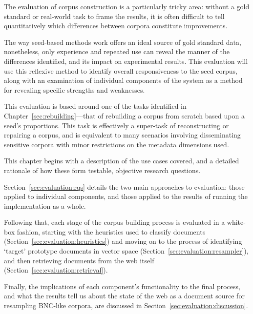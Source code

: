 
The evaluation of corpus construction is a particularly tricky area: without a gold standard or real-world task to frame the results, it is often difficult to tell quantitatively which differences between corpora constitute improvements.


The way seed-based methods work offers an ideal source of gold standard data, nonetheless, only experience and repeated use can reveal the manner of the differences identified, and its impact on experimental results.  This evaluation will use this reflexive method to identify overall responsiveness to the seed corpus, along with an examination of individual components of the system as a method for revealing specific strengths and weaknesses.

This evaluation is based around one of the tasks identified in Chapter~\ref{sec:rebuilding}---that of rebuilding a corpus from scratch based upon a seed's proportions.  This task is effectively a super-task of reconstructing or repairing a corpus, and is equivalent to many scenarios involving disseminating sensitive corpora with minor restrictions on the metadata dimensions used.



This chapter begins with a description of the use cases covered, and a detailed rationale of how these form testable, objective research questions.

Section~\ref{sec:evaluation:rqs} details the two main approaches to evaluation: those applied to individual components, and those applied to the results of running the implementation as a whole.

Following that, each stage of the corpus building process is evaluated in a white-box fashion, starting with the heuristics used to classify documents (Section~\ref{sec:evaluation:heuristics}) and moving on to the process of identifying `target' prototype documents in vector space (Section~\ref{sec:evaluation:resampler}), and then retrieving documents from the web itself (Section~\ref{sec:evaluation:retrieval}).

Finally, the implications of each component's functionality to the final process, and what the results tell us about the state of the web as a document source for resampling BNC-like corpora, are discussed in Section~\ref{sec:evaluation:discussion}.





